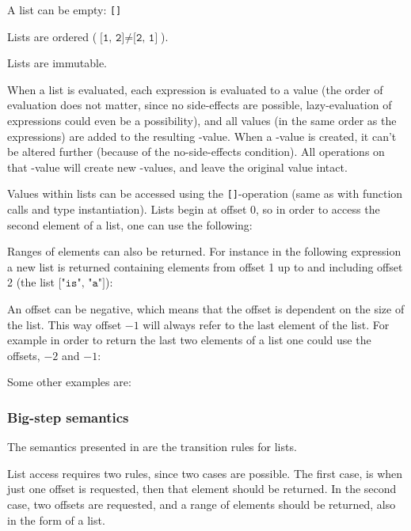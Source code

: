 \begin{nlist}
\item A list can be empty: \texttt{[]}
\item Lists are ordered ($\texttt{[1, 2]} \ne \texttt{[2, 1]}$).
\item Lists are immutable.
\end{nlist}

When a list is evaluated, each expression is evaluated to a value (the order of
evaluation does not matter, since no side-effects are possible, lazy-evaluation
of expressions could even be a possibility), and all values (in the same order
as the expressions) are added to the resulting -value. When a
-value is created, it can't be altered further (because of the
no-side-effects condition). All operations on that -value will create
new -values, and leave the original value intact.

Values within lists can be accessed using the \texttt{[]}-operation (same as
with function calls and type instantiation). Lists begin at offset $0$, so in
order to access the second element of a list, one can use the following:


Ranges of elements can also be returned. For instance in the following
expression a new list is returned containing elements from offset 1 up
to and including offset 2 (the list $\texttt{["is", "a"]}$):


An offset can be negative, which means that the offset is dependent on
the size of the list. This way offset $-1$ will always refer to the last element
of the list. For example in order to return the last two elements of a list one
could use the offsets, $-2$ and $-1$:


Some other examples are:


\subsubsection{Big-step semantics}

The semantics presented in  are the transition rules
for lists.



List access requires two rules, since two cases are possible. The first case, is
when just one offset is requested, then that element should be returned. In the
second case, two offsets are requested, and a range of elements should be
returned, also in the form of a list.

